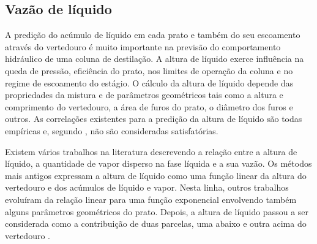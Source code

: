 
\subsection{Vazão de líquido}\label{sec:liqflow}
A predição do acúmulo de líquido em cada prato e também do seu escoamento através do vertedouro é muito importante
na previsão do comportamento hidráulico de uma coluna de destilação. A altura de líquido exerce influência na
queda de pressão, eficiência do prato, nos limites de operação da coluna e no regime de escoamento do estágio.
O cálculo
da altura de líquido depende das propriedades da mistura e de parâmetros
geométricos tais como a altura e comprimento do vertedouro, a área de furos do prato, o diâmetro dos furos e outros.
As correlações existentes para a predição da altura de líquido são todas empíricas e, segundo ,
não são consideradas satisfatórias.

Existem vários trabalhos na literatura descrevendo a relação entre a altura de líquido, a quantidade
de vapor disperso na fase líquida e a sua vazão. Os métodos mais antigos expressam a altura de líquido como uma
função linear da altura do vertedouro e dos acúmulos de líquido e vapor. Nesta linha, outros
trabalhos evoluíram
da relação linear para uma função exponencial envolvendo também alguns parâmetros geométricos do prato. Depois, a altura
de líquido passou a ser considerada como a contribuição de duas parcelas, uma abaixo e outra acima do vertedouro
\cite{Wijn:1999}.


